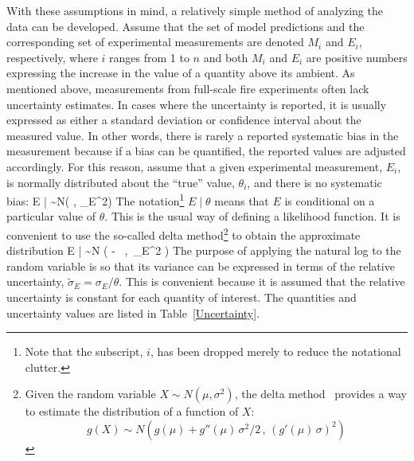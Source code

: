 With these assumptions in mind, a relatively simple method of analyzing the data can be developed.
Assume that the set of model predictions and the corresponding set of experimental measurements are denoted
$M_i$ and $E_i$, respectively, where $i$ ranges from 1 to $n$ and both $M_i$ and $E_i$ are positive numbers
expressing the increase in the value of a quantity above its ambient.
As mentioned above, measurements from full-scale fire experiments often lack uncertainty estimates. In cases where the uncertainty is
reported, it is usually expressed as either a standard deviation or confidence interval about the measured value. In other words, there is rarely
a reported systematic bias in the measurement because if a bias can be quantified, the reported values are adjusted accordingly.
For this reason, assume that a given experimental measurement, $E_i$, is normally
distributed about the ``true'' value, $\theta_i$, and there is no systematic bias:
\be
   E \; | \; \theta \sim N(\theta \; , \; \sigma_E^2) \label{expunc}
\ee
The notation\footnote{Note that the subscript, $i$, has been dropped merely to reduce the notational clutter.}
$E \; | \; \theta$ means that $E$ is conditional on a particular value of $\theta$.
This is the usual way of defining a likelihood function.
It is convenient to use the so-called delta method\footnote{Given the random variable $X \sim N(\mu,\sigma^2)$, the
delta method~\cite{Oehlert:1992} provides a way to estimate the distribution of a function of $X$:
$$g(X) \sim N \left( g(\mu) + g''(\mu) \, \sigma^2/2 \, , \, (g'(\mu) \, \sigma)^2\right)$$} to obtain the approximate distribution
\be
   \ln E \; | \; \theta \sim N \left( \ln \theta -  \, , \,\widetilde{\sigma}_E^2 \right) \label{eeq}
\ee
The purpose of applying the natural log to the random variable is so that its variance can be expressed in terms of the
relative uncertainty, $\widetilde{\sigma}_E=\sigma_E/\theta$. This is convenient because it is assumed that the relative
uncertainty is constant for each quantity of interest. The quantities and uncertainty values are listed in Table~\ref{Uncertainty}.

